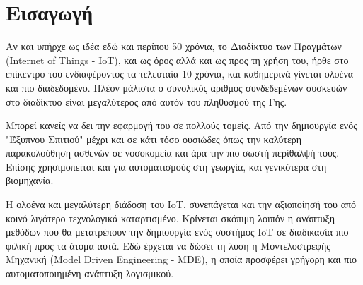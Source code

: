 \chapter{Εισαγωγή}
\label{chapter:intro}

\setlength{\parskip}{1em}

Αν και υπήρχε ως ιδέα εδώ και περίπου 50 χρόνια, το Διαδίκτυο των Πραγμάτων (Internet of Things - IoT), και ως όρος αλλά και ως προς τη χρήση του, ήρθε στο επίκεντρο του ενδιαφέροντος τα τελευταία 10 χρόνια, και καθημερινά γίνεται ολοένα και πιο διαδεδομένο. Πλέον μάλιστα ο συνολικός αριθμός συνδεδεμένων συσκευών στο διαδίκτυο είναι μεγαλύτερος από αυτόν του πληθυσμού της Γης.

Μπορεί κανείς να δει την εφαρμογή του σε πολλούς τομείς. Από την δημιουργία ενός "Έξυπνου Σπιτιού" μέχρι και σε κάτι τόσο ουσιώδες όπως την καλύτερη παρακολούθηση ασθενών σε νοσοκομεία και άρα την πιο σωστή περίθαλψή τους. Επίσης χρησιμοπείται και για αυτοματισμούς στη γεωργία, και γενικότερα στη βιομηχανία.

Η ολοένα και μεγαλύτερη διάδοση του IoT, συνεπάγεται και την αξιοποίησή του από κοινό λιγότερο τεχνολογικά καταρτισμένο. Κρίνεται σκόπιμη λοιπόν η ανάπτυξη μεθόδων που θα μετατρέπουν την δημιουργία ενός συστήμος IoT σε διαδικασία πιο φιλική προς τα άτομα αυτά. Εδώ έρχεται να δώσει τη λύση η Μοντελοστρεφής Μηχανική (Model Driven Engineering - MDE), η οποία προσφέρει γρήγορη και πιο αυτοματοποιημένη ανάπτυξη λογισμικού.




